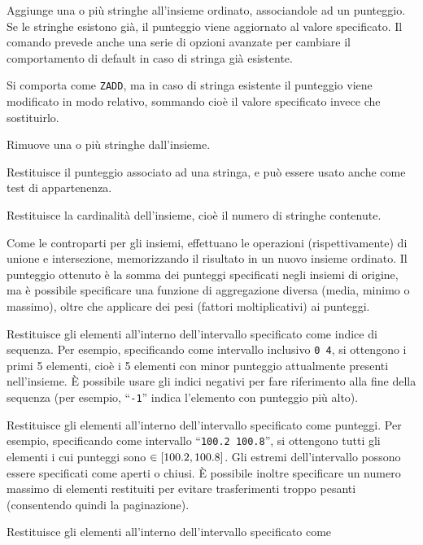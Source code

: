 \begin{description}[style=nextline,font={\bfseries\ttfamily}]
	\item[ZADD] Aggiunge una o più stringhe all'insieme ordinato, associandole ad un punteggio. Se
		le stringhe esistono già, il punteggio viene aggiornato al valore specificato. Il comando
		prevede anche una serie di opzioni avanzate per cambiare il comportamento di default in caso
		di stringa già esistente.
	\item[ZINCRBY] Si comporta come \verb|ZADD|, ma in caso di stringa esistente il punteggio viene
		modificato in modo relativo, sommando cioè il valore specificato invece che sostituirlo.
	\item[ZREM] Rimuove una o più stringhe dall'insieme.
	\item[ZSCORE] Restituisce il punteggio associato ad una stringa, e può essere
		usato anche come test di appartenenza.
	\item[ZCARD] Restituisce la cardinalità dell'insieme, cioè il numero di
		stringhe contenute.
	\item[ZINTERSTORE / ZUNIONSTORE] Come le controparti per gli insiemi, effettuano le operazioni
		(rispettivamente) di unione e intersezione, memorizzando il risultato in un nuovo insieme
		ordinato. Il punteggio ottenuto è la somma dei punteggi specificati negli insiemi di
		origine, ma è possibile specificare una funzione di aggregazione diversa (media, minimo o
		massimo), oltre che applicare dei pesi (fattori moltiplicativi) ai punteggi.
	\item[ZRANGE] Restituisce gli elementi all'interno dell'intervallo specificato come indice di
		sequenza. Per esempio, specificando come intervallo inclusivo \verb|0 4|, si ottengono i
		primi 5 elementi, cioè i 5 elementi con minor punteggio attualmente presenti nell'insieme. È
		possibile usare gli indici negativi per fare riferimento alla fine della sequenza (per
		esempio, ``\verb|-1|'' indica l'elemento con punteggio più alto).
	\item[ZRANGEBYSCORE] Restituisce gli elementi all'interno dell'intervallo specificato come
		punteggi. Per esempio, specificando come intervallo ``\verb|100.2 100.8|'', si ottengono
		tutti gli elementi i cui punteggi sono $\in \interval{100.2}{100.8}$. Gli estremi
		dell'intervallo possono essere specificati come aperti o chiusi. È possibile inoltre
		specificare un numero massimo di elementi restituiti per evitare trasferimenti troppo
		pesanti (consentendo quindi la paginazione).
	\item[ZRANGEBYLEX] Restituisce gli elementi all'interno dell'intervallo specificato come

\end{description}
